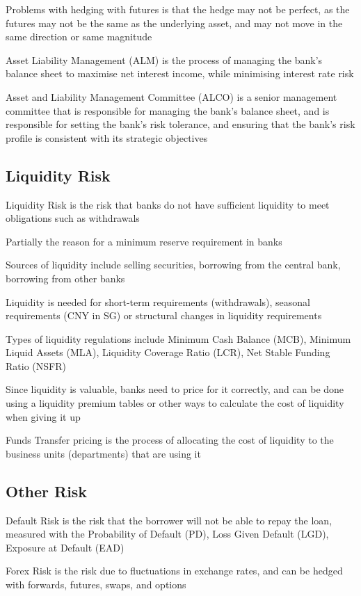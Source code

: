 Problems with hedging with futures is that the hedge may not be perfect, as the futures may not be the same as the underlying asset, and may not move in the same direction or same magnitude

Asset Liability Management (ALM) is the process of managing the bank's balance sheet to maximise net interest income, while minimising interest rate risk

Asset and Liability Management Committee (ALCO) is a senior management committee that is responsible for managing the bank's balance sheet, and is responsible for setting the bank's risk tolerance, and ensuring that the bank's risk profile is consistent with its strategic objectives

\subsection{Liquidity Risk}
Liquidity Risk is the risk that banks do not have sufficient liquidity to meet obligations such as withdrawals

Partially the reason for a minimum reserve requirement in banks

Sources of liquidity include selling securities, borrowing from the central bank, borrowing from other banks

Liquidity is needed for short-term requirements (withdrawals), seasonal requirements (CNY in SG) or structural changes in liquidity requirements

Types of liquidity regulations include Minimum Cash Balance (MCB),
Minimum Liquid Assets (MLA), Liquidity Coverage Ratio (LCR), Net Stable Funding Ratio (NSFR)

Since liquidity is valuable, banks need to price for it correctly, and can be done using a liquidity premium tables or other ways to calculate the cost of liquidity when giving it up

Funds Transfer pricing is the process of allocating the cost of liquidity to the business units (departments) that are using it

\subsection{Other Risk}
Default Risk is the risk that the borrower will not be able to repay the loan, measured
with the Probability of Default (PD), Loss Given Default (LGD), Exposure at Default (EAD)

Forex Risk is the risk due to fluctuations in exchange rates, and can be hedged with forwards, futures, swaps, and options

